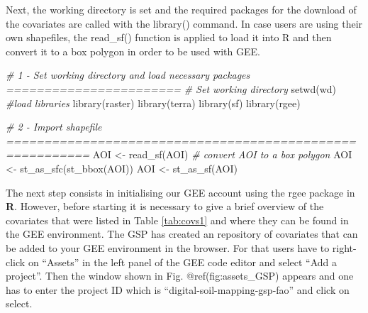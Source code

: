 \documentclass[
  10pt,
  b5paper,
  oneside]{book}
\newenvironment{Shaded}{\begin{snugshade}}{\end{snugshade}}
\newcommand{\CommentTok}[1]{\textcolor[rgb]{0.56,0.35,0.01}{\textit{#1}}}
\newcommand{\FunctionTok}[1]{\textcolor[rgb]{0.00,0.00,0.00}{#1}}
\newcommand{\NormalTok}[1]{#1}
\newcommand{\OtherTok}[1]{\textcolor[rgb]{0.56,0.35,0.01}{#1}}
\begin{document}
Next, the working directory is set and the required packages for the download of the covariates are called with the library() command. In case users are using their own shapefiles, the read\_sf() function is applied to load it into R and then convert it to a box polygon in order to be used with GEE.

\begin{Shaded}
\begin{Highlighting}[]
\CommentTok{\#  1 {-} Set working directory and load necessary packages ======================= }
\CommentTok{\# Set working directory}
\FunctionTok{setwd}\NormalTok{(wd)}
\CommentTok{\#load libraries}
\FunctionTok{library}\NormalTok{(raster)}
\FunctionTok{library}\NormalTok{(terra)}
\FunctionTok{library}\NormalTok{(sf)}
\FunctionTok{library}\NormalTok{(rgee)}


\CommentTok{\# 2 {-} Import shapefile =========================================================}
\NormalTok{AOI }\OtherTok{\textless{}{-}} \FunctionTok{read\_sf}\NormalTok{(AOI)}
\CommentTok{\# convert AOI to a box polygon}
\NormalTok{AOI }\OtherTok{\textless{}{-}} \FunctionTok{st\_as\_sfc}\NormalTok{(}\FunctionTok{st\_bbox}\NormalTok{(AOI))}
\NormalTok{AOI }\OtherTok{\textless{}{-}} \FunctionTok{st\_as\_sf}\NormalTok{(AOI)}
\end{Highlighting}
\end{Shaded}

The next step consists in initialising our GEE account using the rgee package in \textbf{R}. However, before starting it is necessary to give a brief overview of the covariates that were listed in Table \ref{tab:covs1} and where they can be found in the GEE environment. The GSP has created an repository of covariates that can be added to your GEE environment in the browser. For that users have to right-click on ``Assets'' in the left panel of the GEE code editor and select ``Add a project''. Then the window shown in Fig. @ref(fig:assets\_GSP) appears and one has to enter the project ID which is ``digital-soil-mapping-gsp-fao'' and click on select.
\end{document}

